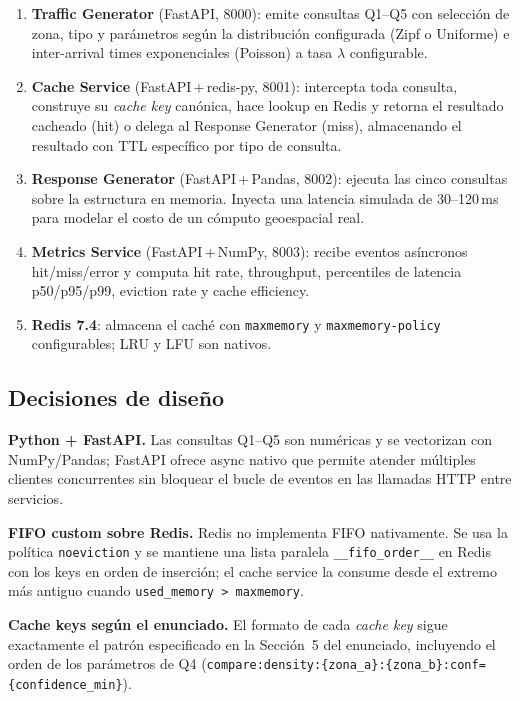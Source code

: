 \documentclass[11pt,a4paper]{article}
\begin{document}
\begin{enumerate}[leftmargin=*]
\item \textbf{Traffic Generator} (FastAPI, 8000): emite consultas Q1--Q5
  con selección de zona, tipo y parámetros según la distribución configurada
  (Zipf o Uniforme) e inter-arrival times exponenciales (Poisson) a tasa
  $\lambda$ configurable.
\item \textbf{Cache Service} (FastAPI\,+\,redis-py, 8001): intercepta toda
  consulta, construye su \textit{cache key} canónica, hace lookup en Redis y
  retorna el resultado cacheado (hit) o delega al Response Generator (miss),
  almacenando el resultado con TTL específico por tipo de consulta.
\item \textbf{Response Generator} (FastAPI\,+\,Pandas, 8002): ejecuta las
  cinco consultas sobre la estructura en memoria. Inyecta una latencia
  simulada de 30--120\,ms para modelar el costo de un cómputo geoespacial
  real.
\item \textbf{Metrics Service} (FastAPI\,+\,NumPy, 8003): recibe eventos
  asíncronos hit/miss/error y computa hit rate, throughput, percentiles de
  latencia p50/p95/p99, eviction rate y cache efficiency.
\item \textbf{Redis 7.4}: almacena el caché con \texttt{maxmemory} y
  \texttt{maxmemory-policy} configurables; LRU y LFU son nativos.
\end{enumerate}

\subsection{Decisiones de diseño}

\textbf{Python + FastAPI.} Las consultas Q1--Q5 son numéricas y se
vectorizan con NumPy/Pandas; FastAPI ofrece async nativo que permite
atender múltiples clientes concurrentes sin bloquear el bucle de eventos en
las llamadas HTTP entre servicios.

\textbf{FIFO custom sobre Redis.} Redis no implementa FIFO nativamente.
Se usa la política \texttt{noeviction} y se mantiene una lista paralela
\texttt{\_\_fifo\_order\_\_} en Redis con los keys en orden de inserción; el
cache service la consume desde el extremo más antiguo cuando
\texttt{used\_memory > maxmemory}.

\textbf{Cache keys según el enunciado.} El formato de cada \textit{cache
key} sigue exactamente el patrón especificado en la Sección~5 del
enunciado, incluyendo el orden de los parámetros de Q4
(\texttt{compare:density:\{zona\_a\}:\{zona\_b\}:conf=\{confidence\_min\}}).
\end{document}
